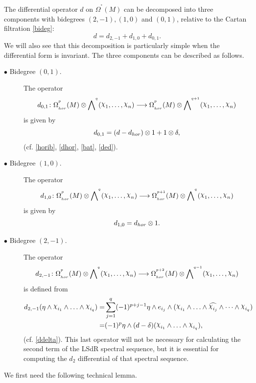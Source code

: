 \documentclass[a4paper,oneside,10pt,reqno]{amsart}
\theoremstyle{definition}
\newcommand{\TO}{\longrightarrow}
\newcommand\chii{\raise2pt\hbox{$\chi$}}
\newcommand\Om{\Omega}
\newcommand{\id}{{\large 1}}
\newcommand{\lau}[4]{{#1}^{^{#2}}_{_{#3}}{\left( #4 \right)}}
\newcommand{\coho}[3]{{#1}^{^{#2}}{\left( #3 \right)}}
\begin{document}
The differential operator $d$ on $\coho \Omega *M$ can be decomposed into three components with bidegrees $(2,-1), (1,0)$ and $(0,1)$, relative to the Cartan filtration \eqref{bideg}:
$$
d = d_{2,-1} + d_{1,0} + d_{0,1}.
$$
We will also see that this decomposition is particularly simple when the differential form is invariant.
The three components can be described as follows.


\begin{description}

\item[$\bullet$ Bidegree $(0,1)$.] The operator 
$$
d_{0,1}  \colon
 \lau \Om p {hor} M \otimes \coho \bigwedge q {\chii_1, \ldots, \chii_n}
 \TO
 \lau \Om {p} {hor} M \otimes \coho \bigwedge {q+1} {\chii_1, \ldots, \chii_n}
 $$
  is given by
\begin{equation}\label{01}
d_{0,1}    =
 (d - d_{hor} )\otimes \id    + \id \otimes \delta,
\end{equation}
 (cf. \eqref{horib}, \eqref{dhor}, \eqref{bat}, \eqref{ded}).
\item[]

\item[$\bullet$ Bidegree $(1,0)$.] The operator 
$$
d_{1,0}   \colon
 \lau \Om p {hor} M \otimes \coho \bigwedge q {\chii_1, \ldots, \chii_n}
 \TO
 \lau \Om {p+1} {hor} M \otimes \coho \bigwedge {q} {\chii_1, \ldots, \chii_n}
 $$
is given by
\begin{equation}\label{10}
 d_{1,0}  = d_{hor}  \otimes \id.
\end{equation}


\item[]

 
 
 \item [$\bullet$ Bidegree $(2,-1)$.] The operator
 $$
d_{2,-1} \colon
 \lau \Om p {hor} M \otimes \coho \bigwedge q {\chii_1, \ldots, \chii_n}
 \TO
 \lau \Om {p+2} {hor} M \otimes \coho \bigwedge {q-1} {\chii_1, \ldots, \chii_n}
 $$ is defined from 
\begin{align*}\label{D}
d_{2,-1} (\eta \wedge  \chii_{i_1}\wedge  \ldots \wedge  \chii_{i_q} )=& 
\sum_{j=1}^q  (-1)^{p+j-1} \eta \wedge e_{i_j} \wedge  (\chii_{i_1}\wedge  \ldots \wedge \widehat{\chii_{i_j}} \wedge \cdots \wedge  \chii_{i_q}) \\
=& (-1)^p \eta \wedge (d  - \delta) ( \chii_{i_1}\wedge  \ldots \wedge  \chii_{i_q}) ,
\end{align*} 
(cf. \eqref{ddelta}).
This last operator will not be necessary for calculating the second term of the LSdR spectral sequence, but it is essential for computing the $d_2$  differential of that spectral sequence.
\end{description}
 We first need the following technical lemma.
\end{document}
